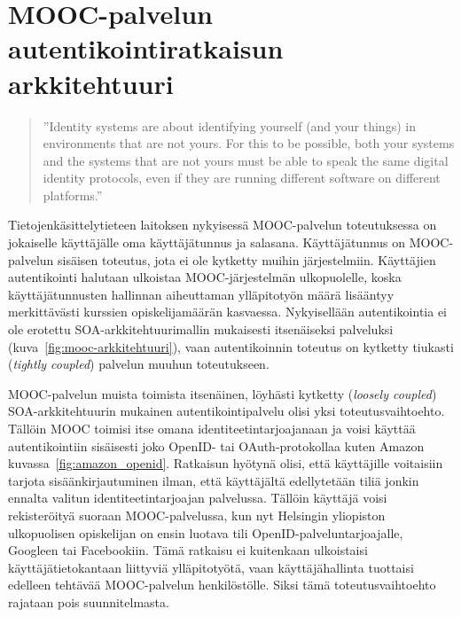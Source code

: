 \documentclass[finnish,gradu]{tktltiki}
\begin{document}






\section{MOOC-palvelun autentikointiratkaisun arkkitehtuuri} %
\label{sec:mooc_palvelun_autentikointiratkaisun_arkkitehtuuri}

  \begin{quote}
    ''Identity systems are about identifying yourself (and your things) in environments that are not yours.
    For this to be possible, both your systems and the systems that are not yours
    must be able to speak the same digital identity protocols,
    even if they are running different software on different platforms.''~\cite{cameron_id_arch_2006}
  \end{quote}

  Tietojenkäsittelytieteen laitoksen nykyisessä MOOC-palvelun toteutuksessa on jokaiselle käyttäjälle oma käyttäjätunnus ja salasana. Käyttäjätunnus on MOOC-palvelun sisäisen toteutus, jota ei ole kytketty muihin järjestelmiin. Käyttäjien autentikointi halutaan ulkoistaa MOOC-järjestelmän ulkopuolelle, koska käyttäjätunnusten hallinnan aiheuttaman ylläpitotyön määrä lisääntyy merkittävästi kurssien opiskelijamäärän kasvaessa. Nykyisellään autentikointia ei ole erotettu SOA-arkkitehtuurimallin mukaisesti itsenäiseksi palveluksi (kuva~\ref{fig:mooc-arkkitehtuuri}), vaan autentikoinnin toteutus on kytketty tiukasti (\emph{tightly coupled}) palvelun muuhun toteutukseen.

  MOOC-palvelun muista toimista itsenäinen, löyhästi kytketty (\emph{loosely coupled}) SOA-arkkitehtuurin mukainen autentikointipalvelu olisi yksi toteutusvaihtoehto. Tällöin MOOC toimisi itse omana identiteetintarjoajanaan ja voisi käyttää autentikointiin sisäisesti joko OpenID- tai OAuth-protokollaa kuten Amazon kuvassa~\ref{fig:amazon_openid}. Ratkaisun hyötynä olisi, että käyttäjille voitaisiin tarjota sisäänkirjautuminen ilman, että käyttäjältä edellytetään tiliä jonkin ennalta valitun identiteetintarjoajan palvelussa. Tällöin käyttäjä voisi rekisteröityä suoraan MOOC-palvelussa, kun nyt Helsingin yliopiston ulkopuolisen opiskelijan on ensin luotava tili OpenID-palveluntarjoajalle, Googleen tai Facebookiin. Tämä ratkaisu ei kuitenkaan ulkoistaisi käyttäjätietokantaan liittyviä ylläpitotyötä, vaan käyttäjähallinta tuottaisi edelleen tehtävää MOOC-palvelun henkilöstölle. Siksi tämä toteutusvaihtoehto rajataan pois suunnitelmasta.
\end{document}
